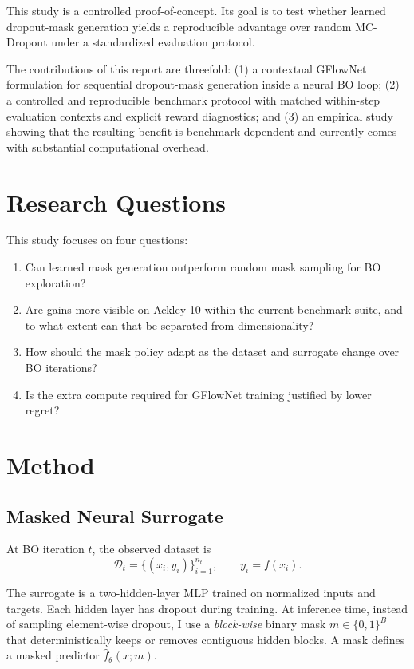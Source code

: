 \documentclass{article}
\begin{document}
This study is a controlled proof-of-concept. Its goal is to test whether learned dropout-mask generation yields a reproducible advantage over random MC-Dropout under a standardized evaluation protocol.

The contributions of this report are threefold: (1) a contextual GFlowNet formulation for sequential dropout-mask generation inside a neural BO loop; (2) a controlled and reproducible benchmark protocol with matched within-step evaluation contexts and explicit reward diagnostics; and (3) an empirical study showing that the resulting benefit is benchmark-dependent and currently comes with substantial computational overhead.

\section{Research Questions}

This study focuses on four questions:

\begin{enumerate}
    \item Can learned mask generation outperform random mask sampling for BO exploration?
    \item Are gains more visible on Ackley-10 within the current benchmark suite, and to what extent can that be separated from dimensionality?
    \item How should the mask policy adapt as the dataset and surrogate change over BO iterations?
    \item Is the extra compute required for GFlowNet training justified by lower regret?
\end{enumerate}

\section{Method}

\subsection{Masked Neural Surrogate}

At BO iteration $t$, the observed dataset is
\[
\mathcal{D}_t = \{(x_i, y_i)\}_{i=1}^{n_t}, \qquad y_i = f(x_i).
\]

The surrogate is a two-hidden-layer MLP trained on normalized inputs and targets. Each hidden layer has dropout during training. At inference time, instead of sampling element-wise dropout, I use a \emph{block-wise} binary mask $m \in \{0,1\}^B$ that deterministically keeps or removes contiguous hidden blocks. A mask defines a masked predictor $\hat f_\theta(x; m)$.
\end{document}
